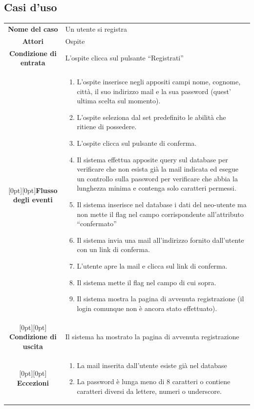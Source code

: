 \documentclass[a4paper,12pt]{article}
\begin{document}
\subsection{Casi d'uso}
\setlength\arrayrulewidth{0.8mm}
\begin{tabularx}{\textwidth}{|c|X|}
\rowcolor[gray]{.9}\hline \textbf{Nome del caso} & Un utente si registra \\ 
\rowcolor[gray]{.9}\hline \textbf{Attori} & Ospite \\ 
\rowcolor[gray]{.9}\hline \textbf{Condizione di entrata} & L'ospite clicca sul pulsante “Registrati” \\ 
\rowcolor[gray]{.9}\hline\raisebox{-27ex}[0pt][0pt]{\textbf{Flusso degli eventi}}& 
\begin{enumerate}
\itemsep0em 
\item L'ospite inserisce negli appositi campi nome, cognome, città, il suo indirizzo mail e la sua password (quest' ultima scelta sul momento).
\item L'ospite seleziona dal set predefinito le abilità che ritiene di possedere.
\item L'ospite clicca sul pulsante di conferma.
\item Il sistema effettua apposite query sul database per verificare che non esista già la mail indicata ed esegue un controllo sulla password per verificare che abbia la lunghezza minima e contenga solo caratteri permessi.
\item Il sistema inserisce nel database i dati del neo-utente ma non mette il flag nel campo corrispondente all'attributo “confermato”
\item Il sistema invia una mail all'indirizzo fornito dall'utente con un link di conferma.
\item L'utente apre la mail e clicca sul link di conferma.
\item Il sistema mette il flag nel campo di cui sopra.
\item Il sistema mostra la pagina di avvenuta registrazione (il login comunque non è ancora stato effettuato).
\end{enumerate}
 \\ 
\rowcolor[gray]{.85}\hline\raisebox{-1ex}[0pt][0pt]{ \textbf{Condizione di uscita}} & Il sistema ha mostrato la pagina di avvenuta registrazione \\
\rowcolor[gray]{.85}\hline\raisebox{-5.5ex}[0pt][0pt] {\textbf{Eccezioni}} & 
\begin{enumerate}
\itemsep0em 
\item La mail inserita dall'utente esiste già nel database
\item La password è lunga meno di 8 caratteri o contiene caratteri diversi da lettere, numeri o underscore.
\end{enumerate}
\\
\hline 
\end{tabularx}
\end{document}
